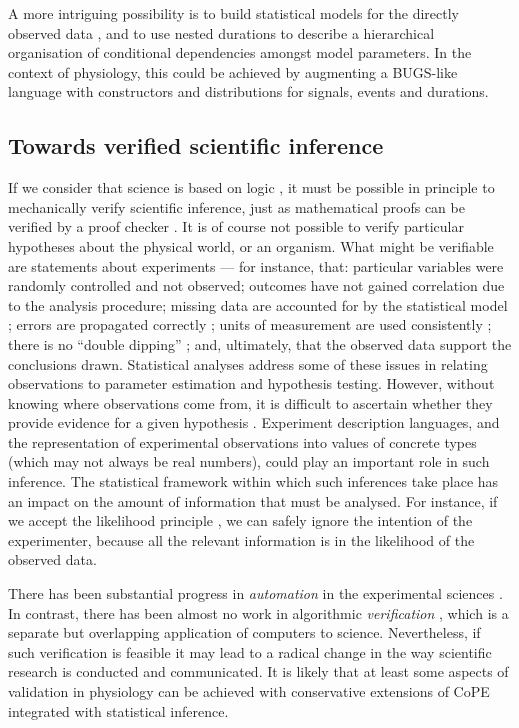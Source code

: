 A more intriguing possibility is to build statistical models for the
directly observed data \cite{Daniell1991}, and to use nested
durations to describe a hierarchical organisation \cite{Rouder2003}
of conditional dependencies amongst model parameters. In the context
of physiology, this could be achieved by augmenting a BUGS-like
\cite{Gilks1994} language with constructors and distributions for
signals, events and durations.


\subsection*{Towards verified scientific inference}

If we consider that science is based on logic \cite{Jaynes2003}, it
must be possible in principle to mechanically verify scientific
inference, just as mathematical proofs can be verified by a proof
checker \cite{Harrison2009}. It is of course not possible to verify
particular hypotheses about the physical world, or an organism. What
might be verifiable are statements about experiments --- for instance,
that: particular variables were randomly controlled and not observed;
outcomes have not gained correlation due to the analysis procedure;
missing data are accounted for by the statistical model
\cite{Gelman2003}; errors are propagated correctly
\cite{Taylor1997}; units of measurement are used consistently
\cite{Kennedy1997}; there is no ``double dipping''
\cite{Kriegeskorte2009}; and, ultimately, that the observed data
support the conclusions drawn. Statistical analyses address some of these
issues in relating observations to parameter estimation and hypothesis
testing. However, without knowing where observations come from, it is
difficult to ascertain whether they provide evidence for a given
hypothesis \cite{Pool2002}. Experiment description languages, and the
representation of experimental observations into values of concrete
types (which may not always be real numbers), could play an important
role in such inference. The statistical framework within which such
inferences take place has an impact on the amount of information that
must be analysed. For instance, if we accept the likelihood principle
\cite{Jaynes2003}, we can safely ignore the intention of the
experimenter, because all the relevant information is in the
likelihood of the observed data.

There has been substantial progress in \emph{automation} in the
experimental sciences \cite{King2004}. In contrast, there has been
almost no work in algorithmic \emph{verification} \cite{Kropf1999,
  Sadot}, which is a separate but overlapping application of
computers to science. Nevertheless, if such verification is
feasible it may lead to a radical change in the way scientific
research is conducted and communicated. It is likely that at least
some aspects of validation in physiology can be achieved with conservative
extensions of
CoPE integrated with statistical inference.

